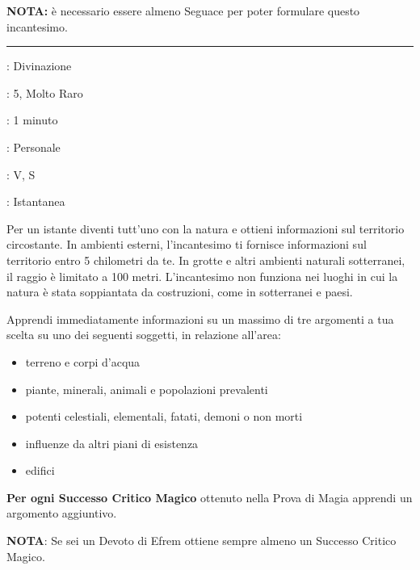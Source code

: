 \begin{multicols}{2}
\textbf{NOTA:} è necessario essere almeno Seguace per poter formulare questo incantesimo.

\smallskip\noindent\rule{\linewidth}{2pt} \hypertarget{Comunione con la Natura}{}\smallskip{}
\noindent
\begin{description}[noitemsep, topsep=0pt, parsep=0pt, partopsep=0pt, leftmargin=0cm, labelwidth=2.8cm]
	\item[\textbf{Lista di Magia}]: Divinazione
	\item[\textbf{Livello}]: 5, Molto Raro
	\item[\textbf{T. di Lancio}]: 1 minuto
	\item[\textbf{Gittata}]: Personale
	\item[\textbf{Componenti}]: V, S
	\item[\textbf{Durata}]: Istantanea
\end{description}

Per un istante diventi tutt'uno con la natura e ottieni informazioni sul territorio circostante. In ambienti esterni, l'incantesimo ti fornisce informazioni sul territorio entro 5 chilometri da te. In grotte e altri ambienti naturali sotterranei, il raggio è limitato a 100 metri. L'incantesimo non funziona nei luoghi in cui la natura è stata soppiantata da costruzioni, come in sotterranei e paesi.

Apprendi immediatamente informazioni su un massimo di tre argomenti a tua scelta su uno dei seguenti soggetti, in relazione all'area:

\begin{itemize}\setlength{\itemsep}{-1pt}
	\item terreno e corpi d'acqua
	\item piante, minerali, animali e popolazioni prevalenti
	\item potenti celestiali, elementali, fatati, demoni o non morti
	\item influenze da altri piani di esistenza
	\item edifici
\end{itemize}

\textbf{Per ogni Successo Critico Magico} ottenuto nella Prova di Magia apprendi un argomento aggiuntivo.

\textbf{NOTA}: Se sei un Devoto di Efrem ottiene sempre almeno un Successo Critico Magico.


\end{multicols}

